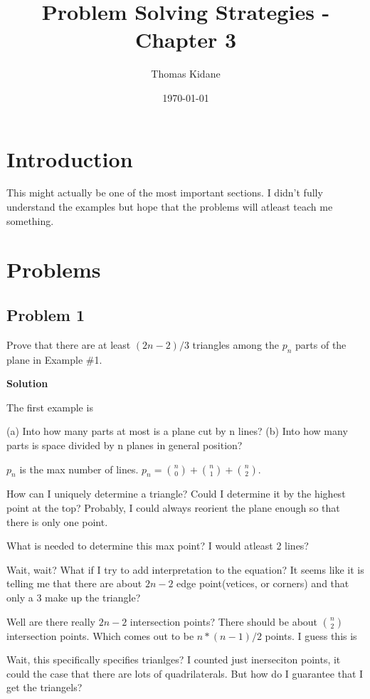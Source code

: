 \documentclass{article}
\title{Problem Solving Strategies - Chapter 3}
\author{Thomas Kidane}
\date{\today}
\begin{document}
\maketitle

\tableofcontents

\section{Introduction}
This might actually be one of the most important sections. I didn't fully understand the examples but hope that the 
problems will atleast teach me something.

\section{Problems}

\subsection{Problem 1}

Prove that there are at least $(2n-2)/3$ triangles among the $p_{n}$ parts of the plane in
Example \#1.

\textbf{Solution}

The first example is 

(a) Into how many parts at most is a plane cut by n lines? (b) Into how many
parts is space divided by n planes in general position?

$p_{n}$ is the max number of lines. $p_{n}=\binom{n}{0}+\binom{n}{1}+\binom{n}{2}$.

How can I uniquely determine a triangle? Could I determine it by the highest point at the top? Probably,
I could always reorient the plane enough so that there is only one point. 

What is needed to determine this max point? I would atleast 2 lines?

Wait, wait? What if I try to add interpretation to the equation? It seems like it is telling me that there are 
about $2n-2$ edge point(vetices, or corners) and that only a 3 make up the triangle?

Well are there really $2n-2$ intersection points? There should be about $\binom{n}{2}$ intersection points. Which 
comes out to be $n*(n-1)/2$ points. I guess this is 


Wait, this specifically specifies trianlges? I counted just inerseciton points, it could the case that there are 
lots of quadrilaterals. But how do I guarantee that I get the triangels?
\end{document}
